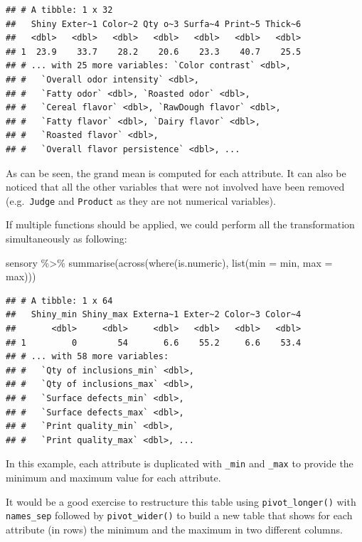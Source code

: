 \documentclass[
]{krantz}
\makeatletter
\newenvironment{Shaded}{\begin{snugshade}}{\end{snugshade}}
\newcommand{\AttributeTok}[1]{\textcolor[rgb]{0.61,0.61,0.61}{#1}}
\newcommand{\FunctionTok}[1]{\textcolor[rgb]{0,0,0}{#1}}
\newcommand{\NormalTok}[1]{#1}
\newcommand{\SpecialCharTok}[1]{\textcolor[rgb]{0,0,0}{#1}}
\renewenvironment{quote}{\begin{VF}}{\end{VF}}
\newenvironment{kframe}{%
\medskip{}
\setlength{\fboxsep}{.8em}
 \def\at@end@of@kframe{}%
 \ifinner\ifhmode%
  \def\at@end@of@kframe{\end{minipage}}%
  \begin{minipage}{\columnwidth}%
 \fi\fi%
 \def\FrameCommand##1{\hskip\@totalleftmargin \hskip-\fboxsep
 \colorbox{shadecolor}{##1}\hskip-\fboxsep
     \hskip-\linewidth \hskip-\@totalleftmargin \hskip\columnwidth}%
 \MakeFramed {\advance\hsize-\width
   \@totalleftmargin\z@ \linewidth\hsize
   \@setminipage}}%
 {\par\unskip\endMakeFramed%
 \at@end@of@kframe}
\renewenvironment{Shaded}{\begin{kframe}}{\end{kframe}}
\makeatother
\begin{document}
\begin{verbatim}
## # A tibble: 1 x 32
##   Shiny Exter~1 Color~2 Qty o~3 Surfa~4 Print~5 Thick~6
##   <dbl>   <dbl>   <dbl>   <dbl>   <dbl>   <dbl>   <dbl>
## 1  23.9    33.7    28.2    20.6    23.3    40.7    25.5
## # ... with 25 more variables: `Color contrast` <dbl>,
## #   `Overall odor intensity` <dbl>,
## #   `Fatty odor` <dbl>, `Roasted odor` <dbl>,
## #   `Cereal flavor` <dbl>, `RawDough flavor` <dbl>,
## #   `Fatty flavor` <dbl>, `Dairy flavor` <dbl>,
## #   `Roasted flavor` <dbl>,
## #   `Overall flavor persistence` <dbl>, ...
\end{verbatim}

As can be seen, the grand mean is computed for each attribute. It can also be noticed that all the other variables that were not involved have been removed (e.g.~\texttt{Judge} and \texttt{Product} as they are not numerical variables).

If multiple functions should be applied, we could perform all the transformation simultaneously as following:

\begin{Shaded}
\begin{Highlighting}[]
\NormalTok{sensory }\SpecialCharTok{\%\textgreater{}\%}
  \FunctionTok{summarise}\NormalTok{(}\FunctionTok{across}\NormalTok{(}\FunctionTok{where}\NormalTok{(is.numeric), }\FunctionTok{list}\NormalTok{(}\AttributeTok{min =}\NormalTok{ min, }\AttributeTok{max =}\NormalTok{ max)))}
\end{Highlighting}
\end{Shaded}

\begin{verbatim}
## # A tibble: 1 x 64
##   Shiny_min Shiny_max Externa~1 Exter~2 Color~3 Color~4
##       <dbl>     <dbl>     <dbl>   <dbl>   <dbl>   <dbl>
## 1         0        54       6.6    55.2     6.6    53.4
## # ... with 58 more variables:
## #   `Qty of inclusions_min` <dbl>,
## #   `Qty of inclusions_max` <dbl>,
## #   `Surface defects_min` <dbl>,
## #   `Surface defects_max` <dbl>,
## #   `Print quality_min` <dbl>,
## #   `Print quality_max` <dbl>, ...
\end{verbatim}

In this example, each attribute is duplicated with \texttt{\_min} and \texttt{\_max} to provide the minimum and maximum value for each attribute.

\begin{quote}
It would be a good exercise to restructure this table using \texttt{pivot\_longer()} with \texttt{names\_sep} followed by \texttt{pivot\_wider()} to build a new table that shows for each attribute (in rows) the minimum and the maximum in two different columns.
\end{quote}
\end{document}
